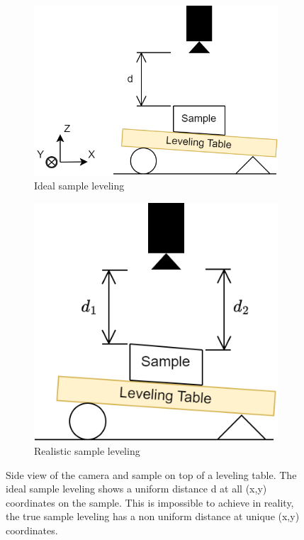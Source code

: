 \documentclass[a4paper,12pt]{article}
\begin{document}
\begin{figure}
    \centering
    \begin{subfigure}{.5\textwidth}
      \centering
      \includegraphics[height=0.75\linewidth]{../diagrams/sample_setup_ideal.png}
      \caption{Ideal sample leveling}
      \label{fig:sub1}
    \end{subfigure}%
    \begin{subfigure}{.5\textwidth}
      \centering
      \includegraphics[height=0.75\linewidth]{../diagrams/sample_setup_realistic.png}
      \caption{Realistic sample leveling}
      \label{fig:sub2}
    \end{subfigure}
    \caption{Side view of the camera and sample on top of a leveling table. The ideal sample leveling shows a uniform distance d at all (x,y) coordinates on the sample. This is impossible to achieve in reality, the true sample leveling has a non uniform distance at unique (x,y) coordinates.}
    \label{fig:test}
\end{figure}
\end{document}
